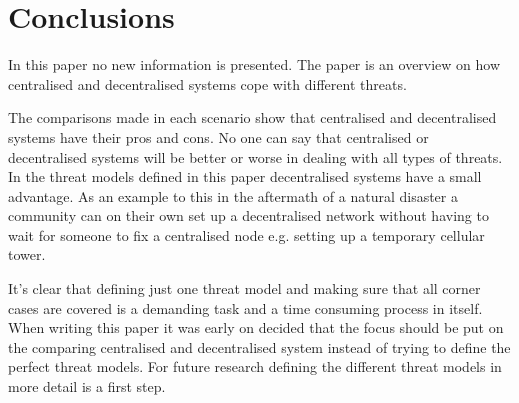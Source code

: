 \section{Conclusions}
In this paper no new information is presented.
The paper is an overview on how centralised and decentralised systems cope with different threats.

The comparisons made in each scenario show that centralised and decentralised systems have their pros and cons.
No one can say that centralised or decentralised systems will be better or worse in dealing with all types of threats.
In the threat models defined in this paper decentralised systems have a small advantage.
As an example to this in the aftermath of a natural disaster a community can on their own set up a decentralised network without having to wait for someone to fix a centralised node e.g. setting up a temporary cellular tower.

It's clear that defining just one threat model and making sure that all corner cases are covered is a demanding task and a time consuming process in itself.
When writing this paper it was early on decided that the focus should be put on the comparing centralised and decentralised system instead of trying to define the perfect threat models.
For future research defining the different threat models in more detail is a first step.




